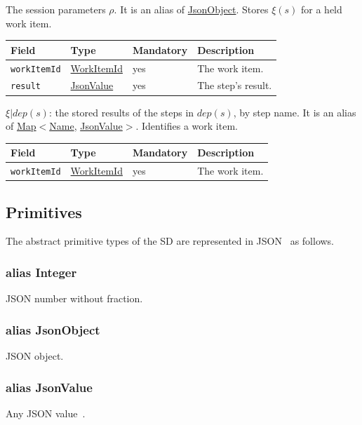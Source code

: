 \documentclass[a4paper]{arrowhead}
\newcommand{\pdef}[1]{{\textcolor{ArrowheadGrey}{#1\label{sec:model:primitives:#1}\label{sec:model:primitives:#1s}}}}
\newcommand{\pref}[1]{{\textcolor{ArrowheadGrey}{\hyperref[sec:model:primitives:#1]{#1}}}}
\begin{document}
The session parameters $\rho$.
 It is an alias of \pref{JsonObject}.
Stores $\xi(s)$ for a held work item.

{\small
\begin{longtable}{|p{3.7cm}|p{4.2cm}|p{1.6cm}|p{6.3cm}|}

\hline
\rowcolor{gray!33} Field & Type & Mandatory & Description \\ \hline
\endhead
\texttt{workItemId} & \pref{WorkItemId} & yes & The work item. \\ \hline
\texttt{result} & \pref{JsonValue} & yes & The step's result. \\ \hline
\end{longtable}
}

$\xi|dep(s)$: the stored results of the steps in $dep(s)$, by step name.
 It is an alias of \pref{Map}$<$\pref{Name}, \pref{JsonValue}$>$.
Identifies a work item.

{\small
\begin{longtable}{|p{3.7cm}|p{4.2cm}|p{1.6cm}|p{6.3cm}|}

\hline
\rowcolor{gray!33} Field & Type & Mandatory & Description \\ \hline
\endhead
\texttt{workItemId} & \pref{WorkItemId} & yes & The work item. \\ \hline
\end{longtable}
}


\subsection{Primitives}
\label{sec:model:primitives}
The abstract primitive types of the SD are represented in JSON~\cite{rfc8259} as follows.
\subsubsection*{alias \pdef{Integer}}
JSON number without fraction.

\subsubsection*{alias \pdef{JsonObject}}
JSON object.

\subsubsection*{alias \pdef{JsonValue}}
Any JSON value~\cite{rfc8259}.
\end{document}
